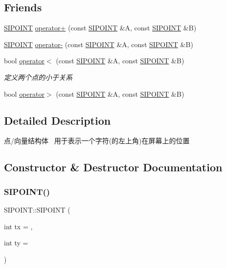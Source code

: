\subsection*{Friends}
\begin{DoxyCompactItemize}
\item 
\hyperlink{struct_s_i_p_o_i_n_t}{S\+I\+P\+O\+I\+NT} \hyperlink{struct_s_i_p_o_i_n_t_abd9be7eb5a981ba5d72d548a32052a01}{operator+} (const \hyperlink{struct_s_i_p_o_i_n_t}{S\+I\+P\+O\+I\+NT} \&A, const \hyperlink{struct_s_i_p_o_i_n_t}{S\+I\+P\+O\+I\+NT} \&B)
\item 
\hyperlink{struct_s_i_p_o_i_n_t}{S\+I\+P\+O\+I\+NT} \hyperlink{struct_s_i_p_o_i_n_t_a1138454683665c35746e210cbf614306}{operator-\/} (const \hyperlink{struct_s_i_p_o_i_n_t}{S\+I\+P\+O\+I\+NT} \&A, const \hyperlink{struct_s_i_p_o_i_n_t}{S\+I\+P\+O\+I\+NT} \&B)
\item 
bool \hyperlink{struct_s_i_p_o_i_n_t_a481c4c62e5b71e5106efc08bd0674b6d}{operator$<$} (const \hyperlink{struct_s_i_p_o_i_n_t}{S\+I\+P\+O\+I\+NT} \&A, const \hyperlink{struct_s_i_p_o_i_n_t}{S\+I\+P\+O\+I\+NT} \&B)
\begin{DoxyCompactList}\small\item\em 定义两个点的小于关系 \end{DoxyCompactList}\item 
bool \hyperlink{struct_s_i_p_o_i_n_t_a815335b01039f8eabf5ef5d797dd3e49}{operator$>$} (const \hyperlink{struct_s_i_p_o_i_n_t}{S\+I\+P\+O\+I\+NT} \&A, const \hyperlink{struct_s_i_p_o_i_n_t}{S\+I\+P\+O\+I\+NT} \&B)
\end{DoxyCompactItemize}


\subsection{Detailed Description}
点/向量结构体~\newline
用于表示一个字符(的左上角)在屏幕上的位置 

\subsection{Constructor \& Destructor Documentation}
\mbox{\label{struct_s_i_p_o_i_n_t_a1695c9d8ff55b1169de1c6a9c379687c}} 
\subsubsection{\texorpdfstring{S\+I\+P\+O\+I\+N\+T()}{SIPOINT()}}
{\footnotesize\ttfamily S\+I\+P\+O\+I\+N\+T\+::\+S\+I\+P\+O\+I\+NT (\begin{DoxyParamCaption}\item[{int}]{tx = {},  }\item[{int}]{ty = {} }\end{DoxyParamCaption})\hspace{0.3cm}{\ttfamily [inline]}}


